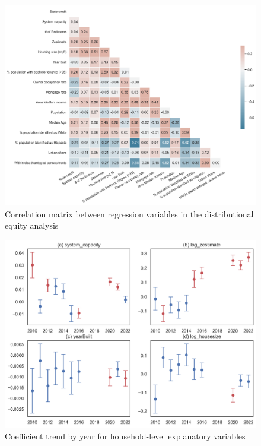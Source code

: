 \documentclass[11pt,twoside,letterpaper]{article}
\begin{document}
\begin{figure}[H]
    \centering
\includegraphics[width=1\textwidth]{figures/corr_matrix.png}
    \caption{Correlation matrix between regression variables in the distributional equity analysis}
    \label{fig:corr_matrix}
\end{figure}

\begin{figure}[H]
    \centering
\includegraphics[width=1\textwidth]{figures/key_coefficient_trend.png}
    \caption{Coefficient trend by year for household-level explanatory variables}
    \label{fig:coefficient_trend}
\end{figure}
\end{document}
